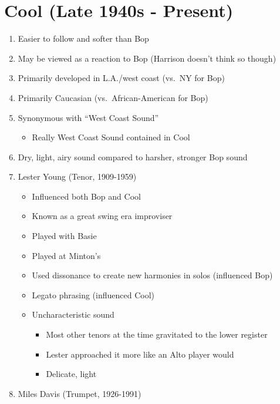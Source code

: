 \documentclass[]{article}
\providecommand{\tightlist}{%
  \setlength{\itemsep}{0pt}\setlength{\parskip}{0pt}}
\begin{document}
\section{Cool (Late 1940s - Present)}\label{cool-late-1940s---present}

\begin{enumerate}
\def\labelenumi{\arabic{enumi}.}
\tightlist
\item
  Easier to follow and softer than Bop
\item
  May be viewed as a reaction to Bop (Harrison doesn't think so though)
\item
  Primarily developed in L.A./west coast (vs.~NY for Bop)
\item
  Primarily Caucasian (vs.~African-American for Bop)
\item
  Synonymous with ``West Coast Sound''

  \begin{itemize}
  \tightlist
  \item
    Really West Coast Sound contained in Cool
  \end{itemize}
\item
  Dry, light, airy sound compared to harsher, stronger Bop sound
\item
  Lester Young (Tenor, 1909-1959)

  \begin{itemize}
  \tightlist
  \item
    Influenced both Bop and Cool
  \item
    Known as a great swing era improviser
  \item
    Played with Basie
  \item
    Played at Minton's
  \item
    Used dissonance to create new harmonies in solos (influenced Bop)
  \item
    Legato phrasing (influenced Cool)
  \item
    Uncharacteristic sound

    \begin{itemize}
    \tightlist
    \item
      Most other tenors at the time gravitated to the lower register
    \item
      Lester approached it more like an Alto player would
    \item
      Delicate, light
    \end{itemize}
  \end{itemize}
\item
  Miles Davis (Trumpet, 1926-1991)


\end{enumerate}
\end{document}
